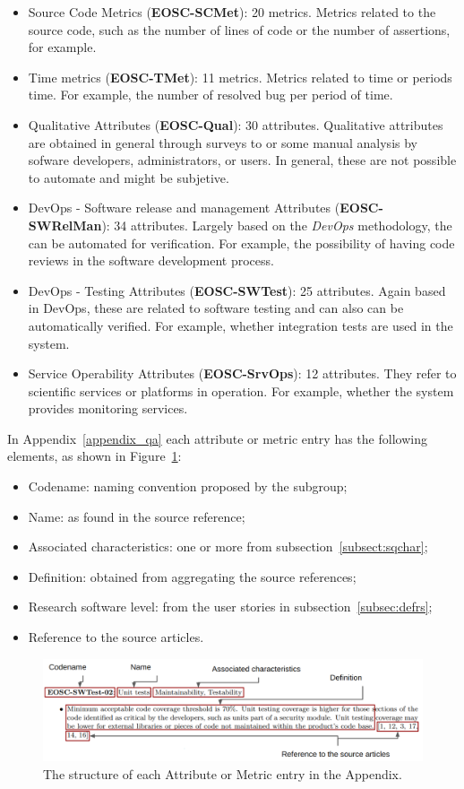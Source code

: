 \begin{itemize}
    \item Source Code Metrics (\textbf{EOSC-SCMet}): 20 metrics. Metrics related to the source code, such as the number of lines of code or the number of assertions, for example.

    \item Time metrics (\textbf{EOSC-TMet}): 11 metrics. Metrics related to time or periods time. For example, the number of resolved bug per period of time.

    \item Qualitative Attributes (\textbf{EOSC-Qual}): 30 attributes. Qualitative attributes are obtained in general through surveys to or some manual analysis by sofware developers, administrators, or users. In general, these are not possible to automate and might be subjetive.

    \item DevOps - Software release and management Attributes (\textbf{EOSC-SWRelMan}): 34 attributes. Largely based on the \textit{DevOps} methodology, the can be automated for verification. For example, the possibility of having code reviews in the software development process.

    \item DevOps - Testing Attributes (\textbf{EOSC-SWTest}): 25 attributes. Again based in DevOps, these are related to software testing and can also can be automatically verified. For example, whether integration tests are used in the system.

    \item Service Operability Attributes (\textbf{EOSC-SrvOps}): 12 attributes. They refer to scientific services or platforms in operation. For example, whether the system provides monitoring services.
\end{itemize}

In Appendix~\ref{appendix_qa} each attribute or metric entry has the following elements, as shown in Figure~\ref{fig:sqattr}:

\begin{itemize}
    \item Codename: naming convention proposed by the subgroup;
    \item Name: as found in the source reference;
    \item Associated characteristics: one or more from subsection~\ref{subsect:sqchar};
    \item Definition: obtained from aggregating the source references;
    \item Research software level: from the user stories in subsection~\ref{subsec:defrs};
    \item Reference to the source articles.
\end{itemize}

\begin{figure}[h]
    \centering
    \includegraphics[width=0.99\linewidth]{imgs/qa.png}
    \caption{The structure of each Attribute or Metric entry in the Appendix.}
    \label{fig:sqattr}
\end{figure}
